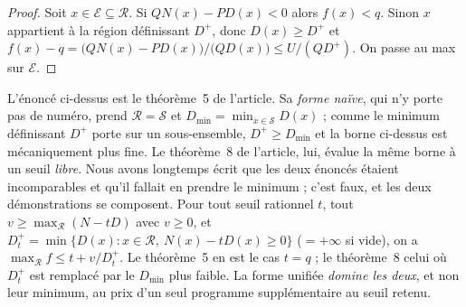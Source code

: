 \documentclass[11pt,a4paper]{article}
\newcommand{\Ecal}{\mathcal{E}}
\newcommand{\Scal}{\mathcal{S}}
\newcommand{\Rcal}{\mathcal{R}}
\begin{document}
\begin{proof}
Soit $x\in\Ecal\subseteq\Rcal$. Si $QN(x)-PD(x)<0$ alors $f(x)<q$. Sinon $x$
appartient à la région définissant $D^{+}$, donc $D(x)\ge D^{+}$ et
$f(x)-q=\bigl(QN(x)-PD(x)\bigr)/\bigl(QD(x)\bigr)\le U/(QD^{+})$. On passe au
max sur $\Ecal$.
\end{proof}

\noindent
L'énoncé ci-dessus est le théorème~5 de l'article. Sa \emph{forme naïve},
qui n'y porte pas de numéro, prend $\Rcal=\Scal$ et
$D_{\min}=\min_{x\in\Scal}D(x)$ ; comme le minimum définissant $D^{+}$ porte
sur un sous-ensemble, $D^{+}\ge D_{\min}$ et la borne ci-dessus est
mécaniquement plus fine. Le théorème~8 de l'article, lui, évalue la même
borne à un seuil \emph{libre}. Nous avons longtemps écrit que les deux
énoncés étaient incomparables et qu'il fallait en prendre le minimum ;
c'est faux, et les deux démonstrations se composent. Pour tout seuil
rationnel $t$, tout $v\ge\max_{\Rcal}(N-tD)$ avec $v\ge 0$, et
$D^{+}_{t}=\min\{D(x):x\in\Rcal,\ N(x)-tD(x)\ge 0\}$ ($=+\infty$ si vide),
on a $\max_{\Rcal}f\le t+v/D^{+}_{t}$. Le théorème~5 en est le cas $t=q$ ;
le théorème~8 celui où $D^{+}_{t}$ est remplacé par le $D_{\min}$ plus
faible. La forme unifiée \emph{domine les deux}, et non leur minimum, au
prix d'un seul programme supplémentaire au seuil retenu.
\end{document}
